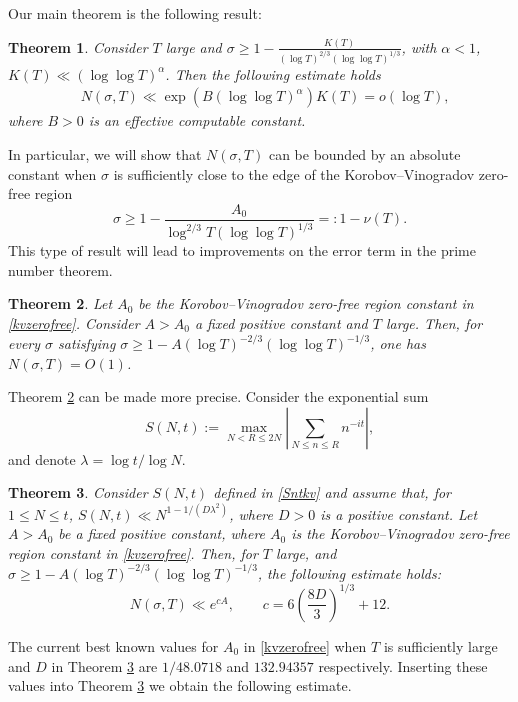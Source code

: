 \documentclass[reqno]{amsart}
\newtheorem{theorem}{Theorem}[section]
\numberwithin{equation}{section}
\theoremstyle{remark}
\begin{document}
Our main theorem is the following result:
\begin{theorem}\label{theorem1general}
Consider $T$ large and $\sigma\ge 1-\frac{K(T)}{(\log T)^{2/3}(\log\log T)^{1/3}}$, with $\alpha<1$, $K(T)\ll (\log\log T)^{\alpha}$. Then 
the following estimate holds
\begin{align*}
    &N(\sigma,T)\ll\exp(B(\log\log T)^\alpha)K(T)=o(\log T),\end{align*}
    where $B>0$ is an effective computable constant.
\end{theorem}
In particular, we will show that $N(\sigma,T)$ can be bounded by an absolute constant when $\sigma$ is sufficiently close to the edge of the Korobov--Vinogradov zero-free region
\begin{equation}\label{kvzerofree}
     \sigma\ge  1-\frac{A_0}{\log^{2/3}T(\log\log T)^{1/3}}=: 1-\nu(T).
\end{equation} This type of result will lead to improvements on the error term in the prime number theorem.
\begin{theorem}\label{edgezerofree}
Let $A_0$ be the Korobov--Vinogradov zero-free region constant in \eqref{kvzerofree}. Consider $A>A_0$ a fixed positive constant and $T$ large. Then, for every $\sigma$ satisfying $\sigma\ge 1-A(\log T)^{-2/3}(\log\log T)^{-1/3}$, one has $N(\sigma,T)=O(1)$. 
\end{theorem}
Theorem \ref{edgezerofree} can be made more precise. Consider the exponential sum
\begin{equation}\label{Sntkv}
S(N, t):= \max _{N<R \leq 2 N}\left|\sum_{N \leq n \leq R} n^{-i t}\right|,
\end{equation}
and denote $\lambda=\log t/\log N$. 
\begin{theorem}\label{th2}
    Consider $S(N,t)$ defined in \eqref{Sntkv} and assume that, for $1 \leq N \leq t$, $S(N, t) \ll N^{1-1/\left(D \lambda^2\right)}$, where $D>0$ is a positive constant. Let $A>A_0$ be a fixed positive constant, where $A_0$ is the Korobov--Vinogradov zero-free region constant in \eqref{kvzerofree}. Then, for $T$ large, and  $\sigma\ge 1-A(\log T)^{-2/3}(\log\log T)^{-1/3}$, the following estimate holds:
$$N(\sigma,T)\ll e^{cA},\qquad c=6\left(\frac{8D}{3}\right)^{1/3}+12.$$
\end{theorem}
The current best known values \cite{bellotti2023explicit} for $A_0$ in \eqref{kvzerofree} when $T$ is sufficiently large and $D$ in Theorem \ref{th2} are $1/48.0718$ and $132.94357$ respectively. Inserting these values into Theorem \ref{th2} we obtain the following estimate.
\end{document}
